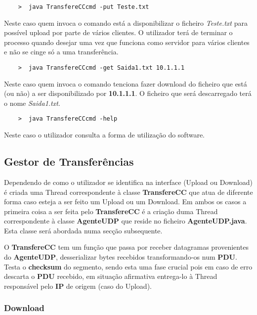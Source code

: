 \documentclass{llncs}
\begin{document}
\begin{verbatim}
	>  java TransfereCCcmd -put Teste.txt
\end{verbatim}

Neste caso quem invoca o comando está a disponibilizar o ficheiro \textit{Teste.txt} para possível upload por parte de vários clientes. O utilizador terá de terminar o processo quando desejar uma vez que funciona como servidor para vários clientes e não se cinge só a uma transferência.

\begin{verbatim}
	>  java TransfereCCcmd -get Saida1.txt 10.1.1.1
\end{verbatim}

Neste caso quem invoca o comando tenciona fazer download do ficheiro que está (ou não) a ser disponibilizado por \textbf{10.1.1.1}. O ficheiro que será descarregado terá o nome \textit{Saida1.txt}.

\begin{verbatim}
	>  java TransfereCCcmd -help
\end{verbatim}

Neste caso o utilizador consulta a forma de utilização do software.


\subsection{Gestor de Transferências}

Dependendo de como o utilizador se identifica na interface (Upload ou Download) é criada uma Thread correspondente à classe \textbf{TransfereCC} que atua de diferente forma caso esteja a ser feito um Upload ou um Download. Em ambos os casos a primeira coisa a ser feita pelo \textbf{TransfereCC} é a criação duma Thread correspondente à classe \textbf{AgenteUDP} que reside no ficheiro \textbf{AgenteUDP.java}. Esta classe será abordada numa secção subsequente.

O \textbf{TransfereCC} tem um função que passa por receber datagramas provenientes do \textbf{AgenteUDP}, desserializar bytes recebidos transformando-os num \textbf{PDU}. Testa o \textbf{checksum} do segmento, sendo esta uma fase crucial pois em caso de erro descarta o \textbf{PDU} recebido, em situação afirmativa entrega-lo à Thread responsável pelo \textbf{IP} de origem (caso do Upload).


\subsubsection{Download}
\end{document}
